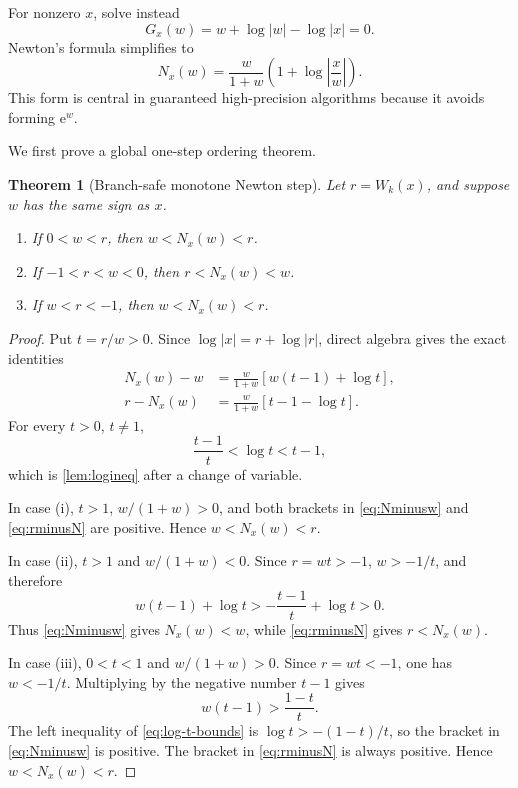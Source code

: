 \documentclass[11pt]{article}
\newtheorem{theorem}{Theorem}[section]
\theoremstyle{remark}
\newcommand{\ee}{\mathrm e}
\newcommand{\abs}[1]{\left|#1\right|}
\begin{document}
For nonzero \(x\), solve instead
\[
       G_x(w)=w+\log\abs w-\log\abs x=0.
\]
Newton's formula simplifies to
\begin{equation}\label{eq:lognewton}
 \boxed{\displaystyle
 N_x(w)=\frac{w}{1+w}
 \left(1+\log\abs{\frac{x}{w}}\right).}
\end{equation}
This form is central in guaranteed high-precision algorithms because it
avoids forming \(\ee^w\).

We first prove a global one-step ordering theorem.

\begin{theorem}[Branch-safe monotone Newton step]\label{thm:lognewton-order}
Let \(r=W_k(x)\), and suppose \(w\) has the same sign as \(x\).
\begin{enumerate}[label=\textup{(\roman*)}]
\item If \(0<w<r\), then \(w<N_x(w)<r\).
\item If \(-1<r<w<0\), then \(r<N_x(w)<w\).
\item If \(w<r<-1\), then \(w<N_x(w)<r\).
\end{enumerate}
\end{theorem}

\begin{proof}
Put \(t=r/w>0\).  Since
\(\log\abs x=r+\log\abs r\), direct algebra gives the exact identities
\begin{align}
 N_x(w)-w
 &=\frac{w}{1+w}\left[w(t-1)+\log t\right],
 \label{eq:Nminusw}\\
 r-N_x(w)
 &=\frac{w}{1+w}\left[t-1-\log t\right].
 \label{eq:rminusN}
\end{align}
For every \(t>0\), \(t\neq1\),
\begin{equation}\label{eq:log-t-bounds}
       \frac{t-1}{t}<\log t<t-1,
\end{equation}
which is \cref{lem:logineq} after a change of variable.

In case (i), \(t>1\), \(w/(1+w)>0\), and both brackets in
\eqref{eq:Nminusw} and \eqref{eq:rminusN} are positive.  Hence
\(w<N_x(w)<r\).

In case (ii), \(t>1\) and \(w/(1+w)<0\).  Since \(r=wt>-1\),
\(w>-1/t\), and therefore
\[
 w(t-1)+\log t
 >-\frac{t-1}{t}+\log t>0.
\]
Thus \eqref{eq:Nminusw} gives \(N_x(w)<w\), while
\eqref{eq:rminusN} gives \(r<N_x(w)\).

In case (iii), \(0<t<1\) and \(w/(1+w)>0\).  Since \(r=wt<-1\),
one has \(w<-1/t\).  Multiplying by the negative number \(t-1\) gives
\[
 w(t-1)>\frac{1-t}{t}.
\]
The left inequality of \eqref{eq:log-t-bounds} is
\(\log t>-(1-t)/t\), so the bracket in \eqref{eq:Nminusw} is positive.
The bracket in \eqref{eq:rminusN} is always positive.  Hence
\(w<N_x(w)<r\).
\end{proof}
\end{document}
